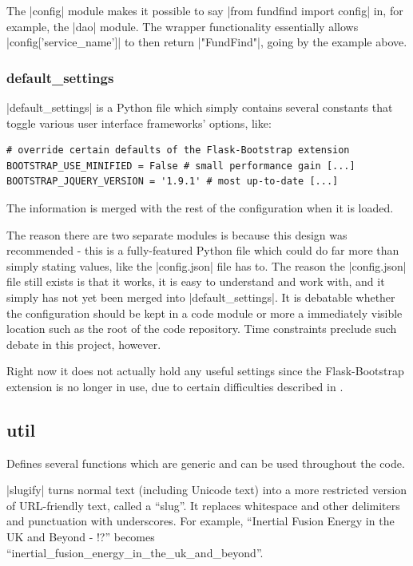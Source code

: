 The |config| module makes it possible to say |from fundfind import config| in, for example, the |dao| module. The wrapper functionality essentially allows |config['service_name']| to then return |"FundFind"|, going by the example above.

\subsubsection{default\_settings}
|default_settings| is a Python file which simply contains several constants that toggle various user interface frameworks' options, like:

\begin{verbatim}
# override certain defaults of the Flask-Bootstrap extension
BOOTSTRAP_USE_MINIFIED = False # small performance gain [...]
BOOTSTRAP_JQUERY_VERSION = '1.9.1' # most up-to-date [...]
\end{verbatim}

The information is merged with the rest of the configuration when it is loaded.

The reason there are two separate modules is because this design was recommended - this is a fully-featured Python file which could do far more than simply stating values, like the |config.json| file has to. The reason the |config.json| file still exists is that it works, it is easy to understand and work with, and it simply has not yet been merged into |default_settings|. It is debatable whether the configuration should be kept in a code module or more a immediately visible location such as the root of the code repository. Time constraints preclude such debate in this project, however.

Right now it does not actually hold any useful settings since the Flask-Bootstrap extension is no longer in use, due to certain difficulties described in .

\subsection{util}
Defines several functions which are generic and can be used throughout the code.

|slugify| turns normal text (including Unicode text) into a more restricted version of URL-friendly text, called a ``slug''. It replaces whitespace and other delimiters and punctuation with underscores. For example, ``Inertial Fusion Energy  in the UK and Beyond       -  !?'' becomes ``inertial\_fusion\_energy\_in\_the\_uk\_and\_beyond''.

